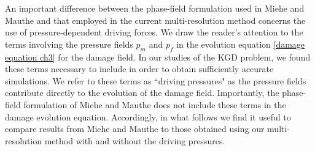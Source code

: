 An important difference between the phase-field formulation used in Miehe and Mauthe \cite{miehe2015minimization, miehe2016phase} and that employed in the current multi-resolution method concerns the use of pressure-dependent driving forces.  We draw the reader's attention to the terms involving the pressure fields $p_m$ and $p_f$ in the evolution equation \eqref{damage equation ch3} for the damage field.  In our studies of the KGD problem, we found these terms necessary to include in order to obtain sufficiently accurate simulations.  We refer to these terms as ``driving pressures" as the pressure fields contribute directly to the evolution of the damage field.  Importantly, the phase-field formulation of Miehe and Mauthe \cite{miehe2015minimization, miehe2016phase} does not include these terms in the damage evolution equation.   Accordingly, in what follows we find it useful to compare results from Miehe and Mauthe \cite{miehe2015minimization, miehe2016phase} to those obtained using our multi-resolution method with and without the driving pressures.  

